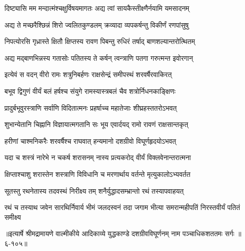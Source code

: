 \twolineshloka
{दिष्ट्यासि मम मन्दात्मंश्चक्षुर्विषयमागतः}
{अद्य त्वां सायकैस्तीक्ष्णैर्नयामि यमसादनम्} %

\twolineshloka
{अद्य ते मच्छरैश्छिन्नं शिरो ज्वलितकुण्डलम्}
{क्रव्यादा व्यपकर्षन्तु विकीर्णं रणपांसुषु} %

\twolineshloka
{निपत्योरसि गृध्रास्ते क्षितौ क्षिप्तस्य रावण}
{पिबन्तु रुधिरं तर्षाद् बाणशल्यान्तरोत्थितम्} %

\twolineshloka
{अद्य मद्बाणभिन्नस्य गतासोः पतितस्य ते}
{कर्षन् त्वन्त्राणि पतगा गरुत्मन्त इवोरगान्} %

\twolineshloka
{इत्येवं स वदन् वीरो रामः शत्रुनिबर्हणः}
{राक्षसेन्द्रं समीपस्थं शरवर्षैरवाकिरत्} %

\twolineshloka
{बभूव द्विगुणं वीर्यं बलं हर्षश्च संयुगे}
{रामस्यास्त्रबलं चैव शत्रोर्निधनकाङ्क्षिणः} %

\twolineshloka
{प्रादुर्बभूवुरस्त्राणि सर्वाणि विदितात्मनः}
{प्रहर्षाच्च महातेजाः शीघ्रहस्ततरोऽभवत्} %

\twolineshloka
{शुभान्येतानि चिह्नानि विज्ञायात्मगतानि सः}
{भूय एवार्दयद् रामो रावणं राक्षसान्तकृत्} %

\twolineshloka
{हरीणां चाश्मनिकरैः शरवर्षैश्च राघवात्}
{हन्यमानो दशग्रीवो विघूर्णहृदयोऽभवत्} %

\twolineshloka
{यदा च शस्त्रं नारेभे न चकर्ष शरासनम्}
{नास्य प्रत्यकरोद् वीर्यं विक्लवेनान्तरात्मना} %

\twolineshloka
{क्षिप्ताश्चाशु शरास्तेन शस्त्राणि विविधानि च}
{मरणार्थाय वर्तन्ते मृत्युकालोऽभ्यवर्तत} %

\twolineshloka
{सूतस्तु रथनेतास्य तदवस्थं निरीक्ष्य तम्}
{शनैर्युद्धादसम्भ्रान्तो रथं तस्यापवाहयत्} %

\twolineshloka
{रथं च तस्याथ जवेन सारथिर्निवार्य भीमं जलदस्वनं तदा}
{जगाम भीत्या समरान्महीपतिं निरस्तवीर्यं पतितं समीक्ष्य} %


॥इत्यार्षे श्रीमद्रामायणे वाल्मीकीये आदिकाव्ये युद्धकाण्डे दशग्रीवविघूर्णनम् नाम पञ्चाधिकशततमः सर्गः ॥६-१०५॥
